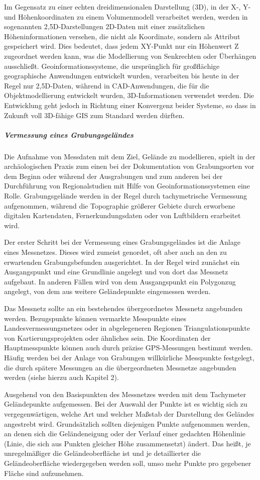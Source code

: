 Im Gegensatz zu einer echten dreidimensionalen Darstellung (3D), in der X-, Y- und Höhenkoordinaten zu einem Volumenmodell verarbeitet werden, werden in sogenannten 2,5D-Darstellungen 2D-Daten mit einer zusätzlichen Höheninformationen versehen, die nicht als Koordinate, sondern als Attribut gespeichert wird. Dies bedeutet, dass jedem XY-Punkt nur ein Höhenwert Z zugeordnet werden kann, was die Modellierung von Senkrechten oder Überhängen ausschließt. Geoinformationssysteme, die ursprünglich für großflächige geographische Anwendungen entwickelt wurden, verarbeiten bis heute in der Regel nur 2,5D-Daten, während in CAD-Anwendungen, die für die Objektmodellierung entwickelt wurden, 3D-Informationen verwendet werden. Die Entwicklung geht jedoch in Richtung einer Konvergenz beider Systeme, so dass in Zukunft voll 3D-fähige GIS zum Standard werden dürften.

\subparagraph{Vermessung eines Grabungsgeländes}
Die Aufnahme von Messdaten mit dem Ziel, Gelände zu modellieren, spielt in der archäologischen Praxis zum einen bei der Dokumentation von Grabungsorten vor dem Beginn oder während der Ausgrabungen und zum anderen bei der Durchführung von Regionalstudien mit Hilfe von Geoinformationssystemen eine Rolle. Grabungsgelände werden in der Regel durch tachymetrische Vermessung aufgenommen, während die Topographie größerer Gebiete durch erworbene digitalen Kartendaten, Fernerkundungsdaten oder von Luftbildern erarbeitet wird.

Der erster Schritt bei der Vermessung eines Grabungsgeländes ist die Anlage eines Messnetzes. Dieses wird zumeist genordet, oft aber auch an den zu erwartenden Grabungsbefunden ausgerichtet. In der Regel wird zunächst ein Ausgangspunkt und eine Grundlinie angelegt und von dort das Messnetz aufgebaut. In anderen Fällen wird von dem Ausgangspunkt ein Polygonzug angelegt, von dem aus weitere Geländepunkte eingemessen werden.

Das Messnetz sollte an ein bestehendes übergeordnetes Messnetz angebunden werden. Bezugspunkte können vermarkte Messpunkte eines Landesvermessungsnetzes oder in abgelegeneren Regionen Triangulationspunkte von Kartierungsprojekten oder ähnliches sein. Die Koordinaten der Hauptmesspunkte können auch durch präzise GPS-Messungen bestimmt werden. Häufig werden bei der Anlage von Grabungen willkürliche Messpunkte festgelegt, die durch spätere Messungen an die übergeordneten Messnetze angebunden werden (siehe hierzu auch Kapitel 2).

Ausgehend von den Basispunkten des Messnetzes werden mit dem Tachymeter Geländepunkte aufgemessen. Bei der Auswahl der Punkte ist es wichtig sich zu vergegenwärtigen, welche Art und welcher Maßstab der Darstellung des Geländes angestrebt wird. Grundsätzlich sollten diejenigen Punkte aufgenommen werden, an denen sich die Geländeneigung oder der Verlauf einer gedachten Höhenlinie (Linie, die sich aus Punkten gleicher Höhe zusammensetzt) ändert. Das heißt, je unregelmäßiger die Geländeoberfläche ist und je detaillierter die Geländeoberfläche wiedergegeben werden soll, umso mehr Punkte pro gegebener Fläche sind aufzunehmen.

